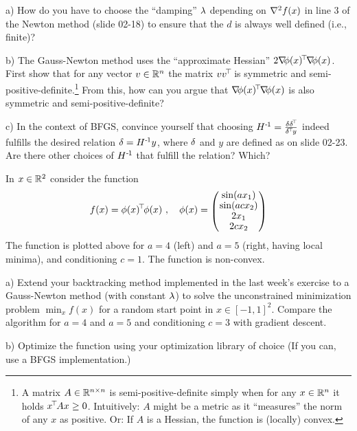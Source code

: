 

\renewcommand{\course}{Optimization}
\renewcommand{\coursepicture}{optim}
\renewcommand{\coursedate}{Summer 2015}
\renewcommand{\exnum}{3}

\exercises
{}
\exercisestitle



a) How do you have to choose the ``damping'' $\lambda$ depending on ${\nabla_{\!\!}^2}
f(x)$ in line 3 of the Newton method (slide 02-18) to ensure that the
$d$ is always well defined (i.e., finite)?

b) The Gauss-Newton method uses the ``approximate Hessian''
$2{\nabla_{\!\!}}\phi(x)^{\!\top\!} {\nabla_{\!\!}}\phi(x)$. First show that for any vector
$v\in{\mathbb{R}}^n$ the matrix $v v^{\!\top\!}$ is symmetric and
semi-positive-definite.\footnote{ A matrix $A\in{\mathbb{R}}^{n\times n}$ is
semi-positive-definite simply when for any $x\in{\mathbb{R}}^n$ it holds $x^{\!\top\!}
A x \ge 0$. Intuitively: $A$ might be a metric as it ``measures'' the
norm of any $x$ as positive. Or: If $A$ is a Hessian, the function is
(locally) convex.}  From this, how can you argue that
${\nabla_{\!\!}}\phi(x)^{\!\top\!} {\nabla_{\!\!}}\phi(x)$ is also symmetric and
semi-positive-definite?

c) In the context of BFGS, convince yourself that choosing $H^{{\hspace*{-.0pt}\text{\rm -}\hspace*{-.5pt}}1}
= \frac{\delta \delta^{\!\top\!}}{\delta^{\!\top\!} y}$ indeed fulfills the desired relation $\delta =
H^{{\hspace*{-.0pt}\text{\rm -}\hspace*{-.5pt}}1} y$, where $\delta$ and $y$ are defined as on slide 02-23. Are there other
choices of $H^{{\hspace*{-.0pt}\text{\rm -}\hspace*{-.5pt}}1}$ that fulfill the relation? Which?





In $x\in{\mathbb{R}}^2$ consider the function
$$f(x) = \phi(x)^\T \phi(x) \comma \phi(x) = \mat{c}{
\sin(a x_1) \\
\sin(a c x_2) \\
2x_1 \\
2c x_2
}$$
The function is plotted above for $a=4$ (left) and $a=5$ (right,
having local minima), and conditioning $c=1$. The function is
non-convex.

a) Extend your backtracking method implemented in the last week's exercise
to a Gauss-Newton method (with constant $\lambda$) to solve the unconstrained
minimization problem $\min_x f(x)$ for a random start point in
$x\in[-1,1]^2$. Compare the algorithm for $a=4$ and $a=5$ and
conditioning $c=3$ with gradient descent.

b) Optimize the function using your optimization library of choice (If you can,
use a BFGS implementation.)

\exerfoot
